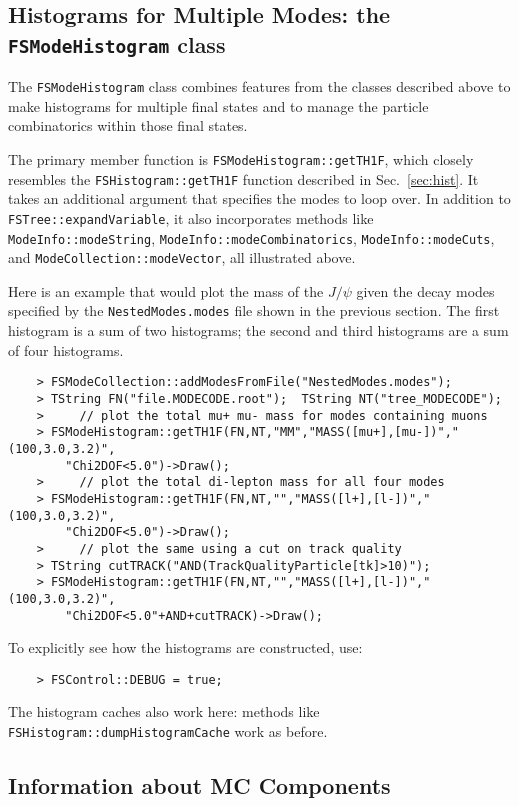 \documentclass[11pt]{article}
\begin{document}
\subsection{Histograms for Multiple Modes: the {\tt FSModeHistogram} class}
\label{sec:modehist}

The {\tt FSModeHistogram} class combines features from the classes described above to make histograms for multiple final states and to manage the particle combinatorics within those final states.

The primary member function is {\tt FSModeHistogram::getTH1F}, which closely resembles the {\tt FSHistogram::getTH1F} function described in Sec.~\ref{sec:hist}.  It takes an additional argument that specifies the modes to loop over.  In addition to {\tt FSTree::expandVariable}, it also incorporates methods like {\tt ModeInfo::modeString}, {\tt ModeInfo::modeCombinatorics}, {\tt ModeInfo::modeCuts}, and {\tt ModeCollection::modeVector}, all illustrated above. 

Here is an example that would plot the mass of the $J/\psi$ given the decay modes specified by the {\tt NestedModes.modes} file shown in the previous section.  The first histogram is a sum of two histograms; the second and third histograms are a sum of four histograms.
\begin{verbatim}
    > FSModeCollection::addModesFromFile("NestedModes.modes");
    > TString FN("file.MODECODE.root");  TString NT("tree_MODECODE");
    >     // plot the total mu+ mu- mass for modes containing muons  
    > FSModeHistogram::getTH1F(FN,NT,"MM","MASS([mu+],[mu-])","(100,3.0,3.2)",
        "Chi2DOF<5.0")->Draw();
    >     // plot the total di-lepton mass for all four modes  
    > FSModeHistogram::getTH1F(FN,NT,"","MASS([l+],[l-])","(100,3.0,3.2)",
        "Chi2DOF<5.0")->Draw();
    >     // plot the same using a cut on track quality
    > TString cutTRACK("AND(TrackQualityParticle[tk]>10)");
    > FSModeHistogram::getTH1F(FN,NT,"","MASS([l+],[l-])","(100,3.0,3.2)",
        "Chi2DOF<5.0"+AND+cutTRACK)->Draw();
\end{verbatim}

To explicitly see how the histograms are constructed, use:
\begin{verbatim}
    > FSControl::DEBUG = true;
\end{verbatim}

The histogram caches also work here:  methods like {\tt FSHistogram::dumpHistogramCache} work as before.

\subsection{Information about MC Components}
\label{sec:mccomponents}
\end{document}
